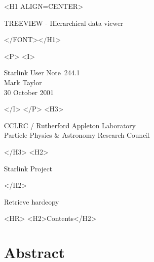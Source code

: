 \documentclass[twoside,11pt]{article}
\newcommand{\stardoccategory}  {Starlink User Note}
\newcommand{\stardocsource}    {sun\stardocnumber}
\newcommand{\stardocnumber}    {244.1}
\newcommand{\stardocauthors}   {Mark Taylor}
\newcommand{\stardocdate}      {30 October 2001}
\newcommand{\stardoctitle}     {TREEVIEW - Hierarchical data viewer}
\newcommand{\htmladdnormallink}[2]{#1}
\newcommand{\htmladdimg}[1]{}
\newcommand{\htmlref}[2]{#1}
\newcommand{\htmladdtonavigation}[1]{}
\newcommand{\xlabel}[1]{}
\renewcommand{\_}{\texttt{\symbol{95}}}
\begin{document}
\begin{htmlonly}
   \xlabel{}
   \begin{rawhtml} <H1 ALIGN=CENTER>\end{rawhtml}
      \stardoctitle
   \begin{rawhtml} </FONT></H1> \end{rawhtml}


   \begin{rawhtml} <P> <I> \end{rawhtml}
   \stardoccategory\ \stardocnumber \\
   \stardocauthors \\
   \stardocdate
   \begin{rawhtml} </I> </P> <H3> \end{rawhtml}
      \htmladdnormallink{CCLRC / Rutherford Appleton Laboratory}
                        {http://www.cclrc.ac.uk} \\
      \htmladdnormallink{Particle Physics \& Astronomy Research Council}
                        {http://www.pparc.ac.uk} \\
   \begin{rawhtml} </H3> <H2> \end{rawhtml}
      \htmladdnormallink{Starlink Project}{http://www.starlink.rl.ac.uk/}
   \begin{rawhtml} </H2> \end{rawhtml}
   \htmladdnormallink{\htmladdimg{source.gif} Retrieve hardcopy}
      {http://www.starlink.rl.ac.uk/cgi-bin/hcserver?\stardocsource}\\

  \label{stardoccontents}
  \begin{rawhtml}
    <HR>
    <H2>Contents</H2>
  \end{rawhtml}
  \htmladdtonavigation{\htmlref{\htmladdimg{contents_motif.gif}}
        {stardoccontents}}

  \section{\xlabel{abstract}Abstract}
\end{htmlonly}
\end{document}
